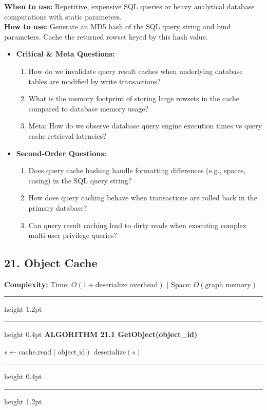 \documentclass[11pt,a4paper]{article}
\newenvironment{textbookalgo}[2]{%
  \par\addvspace{1.2em}\noindent
  \hrule height 1.2pt
  \vspace{1.5pt}
  \hrule height 0.4pt
  \vspace{5pt}
  {\noindent\large\bfseries\sffamily ALGORITHM #1 \quad #2}
  \par\vspace{5pt}
  \RestyleAlgo{plain}
}{%
  \par\vspace{4pt}
  \hrule height 0.4pt
  \vspace{1.5pt}
  \hrule height 1.2pt
  \par\addvspace{1.2em}
}
\theoremstyle{definition}
\begin{document}
\noindent
\textbf{When to use:} Repetitive, expensive SQL queries or heavy analytical database computations with static parameters.\\
\textbf{How to use:} Generate an MD5 hash of the SQL query string and bind parameters. Cache the returned rowset keyed by this hash value.
\begin{itemize}[leftmargin=*]
  \item[] \textbf{Critical \& Meta Questions:}
  \begin{enumerate}
  \item How do we invalidate query result caches when underlying database tables are modified by write transactions?
  \item What is the memory footprint of storing large rowsets in the cache compared to database memory usage?
  \item Meta: How do we observe database query engine execution times vs query cache retrieval latencies?
  \end{enumerate}
  \item[] \textbf{Second-Order Questions:}
  \begin{enumerate}
  \item Does query cache hashing handle formatting differences (e.g., spaces, casing) in the SQL query string?
  \item How does query caching behave when transactions are rolled back in the primary database?
  \item Can query result caching lead to dirty reads when executing complex multi-user privilege queries?
  \end{enumerate}
\end{itemize}
\medskip

\clearpage
\subsection{21. Object Cache}

\noindent
\textbf{Complexity:} Time: $O(1 + \text{deserialize\_overhead})$ | Space: $O(\text{graph\_memory})$
\smallskip

\begin{textbookalgo}{21.1}{GetObject(object\_id)}
\begin{algorithm}[H]
$s \leftarrow \text{cache.read}(\text{object\_id})$\;
\Return $\text{deserialize}(s)$\;
\end{algorithm}
\end{textbookalgo}
\end{document}
